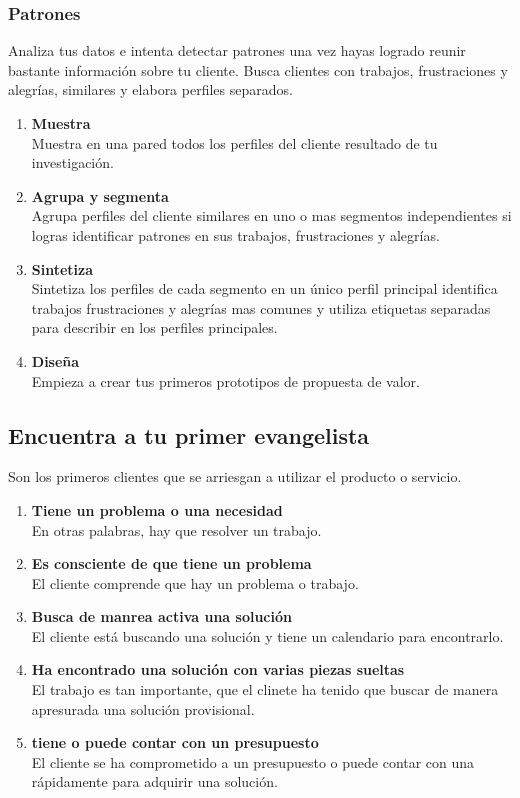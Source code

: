\documentclass[11pt]{book}
\begin{document}
\subsubsection{Patrones}
Analiza tus datos e intenta detectar patrones una vez hayas logrado reunir bastante información sobre tu cliente.
Busca clientes con trabajos, frustraciones y alegrías, similares y elabora perfiles separados.
\begin{enumerate}
\item \textbf{ Muestra }\\
Muestra en una pared todos los perfiles del cliente resultado de tu investigación.
\item \textbf{ Agrupa y segmenta }\\
Agrupa perfiles del cliente similares en uno o mas segmentos independientes si logras identificar patrones en sus trabajos, frustraciones y alegrías.
\item \textbf{ Sintetiza }\\
Sintetiza los perfiles de cada segmento en un único perfil principal identifica trabajos frustraciones y alegrías mas comunes y utiliza etiquetas separadas para describir en los perfiles principales.
\item \textbf{ Diseña }\\
Empieza a crear tus primeros prototipos de propuesta de valor. 
\end{enumerate}
\subsection{Encuentra a tu primer evangelista}
Son los primeros clientes que se arriesgan a utilizar el producto o servicio.
\begin{enumerate}
\item \textbf{ Tiene un problema o una necesidad }\\
En otras palabras, hay que resolver un trabajo.
\item \textbf{ Es consciente de que tiene un problema }\\
El cliente comprende que hay un problema o trabajo.
\item \textbf{ Busca de manrea activa una solución }\\
El cliente está buscando una solución y tiene un calendario para encontrarlo.
\item \textbf{ Ha encontrado una solución con varias piezas sueltas }\\
El trabajo es tan importante, que el clinete ha tenido que buscar de manera apresurada una solución provisional.
\item \textbf{ tiene o puede contar con un presupuesto }\\
El cliente se ha comprometido a un presupuesto o puede contar con una rápidamente para adquirir una solución.
\end{enumerate}
\end{document}
